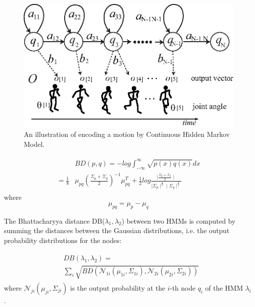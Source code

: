 \begin{figure}[t!]
  \centering
  \includegraphics[width=14cm]{./fig_cha5/chmm.eps}
  \caption{ \scriptsize{An illustration of encoding a motion by Continuous Hidden Markov Model\protect\footnotemark.}
}
    \label{fig:chmm}
\end{figure}


\begin{align}
\begin{split}
&BD(p,q) = -log\int^{\infty}_{-\infty}\sqrt{p(x)q(x)}dx \\
=\frac{1}{8}&\mu_{pq}\left({\frac{\Sigma_p+\Sigma_q}{2}}\right)^{-1}\mu_{pq}^T +\frac{1}{2}log{\frac{\mid\frac{\Sigma_p+\Sigma_q}{2}\mid}{\mid\Sigma_p\mid^{\frac{1}{2}}\mid \Sigma_q\mid^{\frac{1}{2}}}}
\end{split}
\end{align}
where
\begin{equation}
\mu_{pq} = \mu_p - \mu_q
\end{equation}

The Bhattacharyya distance DB($\lambda_1, \lambda_2$) between two HMMs is computed by summing the distances between the Gaussian distributions, i.e. the output probability distributions for the nodes:

\begin{align}
\begin{split}
&DB(\lambda_1, \lambda_2) = \\
&\sum_i\sqrt{BD\left(\mathcal{N}_{1i}\left(\mu_{1i},\Sigma_{1i}\right), \mathcal{N}_{2i}\left(\mu_{2i},\Sigma_{2i}\right)\right)}
\end{split}
\end{align}
where $\mathcal{N}_{ji}(\mu_{ji},\Sigma_{ji})$ is the output probability at the $i$-th node $q_i$ of the HMM $\lambda_i$.

